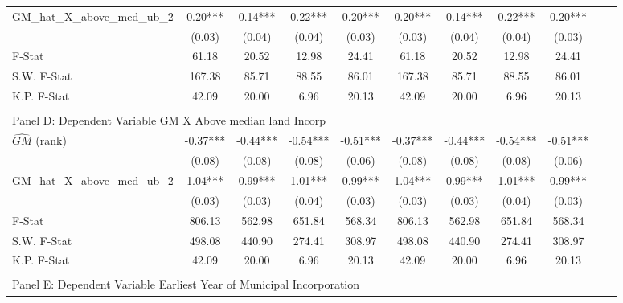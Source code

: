 \begin{table}[htbp]
\begin{threeparttable}
\begin{tabular}{l*{10}{c}}
\addlinespace
GM\_hat\_X\_above\_med\_ub\_2&       0.20***&       0.14***&       0.22***&       0.20***&       0.20***&       0.14***&       0.22***&       0.20***\\
                &     (0.03)   &     (0.04)   &     (0.04)   &     (0.03)   &     (0.03)   &     (0.04)   &     (0.04)   &     (0.03)   \\
\midrule
F-Stat          &      61.18   &      20.52   &      12.98   &      24.41   &      61.18   &      20.52   &      12.98   &      24.41   \\
S.W. F-Stat     &     167.38   &      85.71   &      88.55   &      86.01   &     167.38   &      85.71   &      88.55   &      86.01   \\
K.P. F-Stat     &      42.09   &      20.00   &       6.96   &      20.13   &      42.09   &      20.00   &       6.96   &      20.13   \\
\cmidrule[\heavyrulewidth](lr){1-9} \\ \cmidrule[\heavyrulewidth](lr){1-9}
\multicolumn{8}{l}{Panel D: Dependent Variable GM X Above median land Incorp}\\
\cmidrule(lr){1-9}
$\hat{GM}$ (rank)&      -0.37***&      -0.44***&      -0.54***&      -0.51***&      -0.37***&      -0.44***&      -0.54***&      -0.51***\\
                &     (0.08)   &     (0.08)   &     (0.08)   &     (0.06)   &     (0.08)   &     (0.08)   &     (0.08)   &     (0.06)   \\
\addlinespace
GM\_hat\_X\_above\_med\_ub\_2&       1.04***&       0.99***&       1.01***&       0.99***&       1.04***&       0.99***&       1.01***&       0.99***\\
                &     (0.03)   &     (0.03)   &     (0.04)   &     (0.03)   &     (0.03)   &     (0.03)   &     (0.04)   &     (0.03)   \\
\midrule
F-Stat          &     806.13   &     562.98   &     651.84   &     568.34   &     806.13   &     562.98   &     651.84   &     568.34   \\
S.W. F-Stat     &     498.08   &     440.90   &     274.41   &     308.97   &     498.08   &     440.90   &     274.41   &     308.97   \\
K.P. F-Stat     &      42.09   &      20.00   &       6.96   &      20.13   &      42.09   &      20.00   &       6.96   &      20.13   \\
\cmidrule[\heavyrulewidth](lr){1-9} \\ \cmidrule[\heavyrulewidth](lr){1-9}
\multicolumn{8}{l}{Panel E: Dependent Variable Earliest Year of Municipal Incorporation}\\

\end{tabular}
\end{threeparttable}
\end{table}
